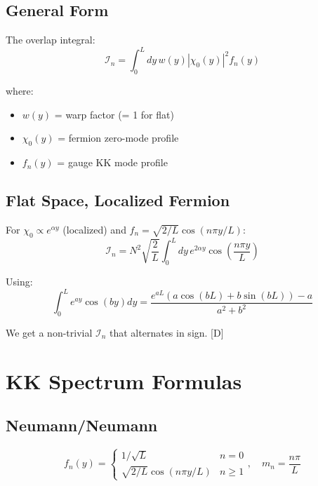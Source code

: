 \documentclass[11pt,a4paper]{article}
\newcommand{\tagD}{\textcolor{blue!70!black}{[D]}}
\begin{document}
\subsection{General Form}

The overlap integral:
\begin{equation}
\label{eq:app-overlap}
\mathcal{I}_n = \int_0^L dy\, w(y) |\chi_0(y)|^2 f_n(y)
\end{equation}

where:
\begin{itemize}
    \item $w(y)$ = warp factor (= 1 for flat)
    \item $\chi_0(y)$ = fermion zero-mode profile
    \item $f_n(y)$ = gauge KK mode profile
\end{itemize}

\subsection{Flat Space, Localized Fermion}

For $\chi_0 \propto e^{\alpha y}$ (localized) and $f_n = \sqrt{2/L}\cos(n\pi y/L)$:
\begin{equation}
\label{eq:app-overlap-loc}
\mathcal{I}_n = N^2 \sqrt{\frac{2}{L}} \int_0^L dy\, e^{2\alpha y} \cos\left(\frac{n\pi y}{L}\right)
\end{equation}

Using:
\begin{equation}
\label{eq:app-integral}
\int_0^L e^{ay} \cos(by) dy = \frac{e^{aL}(a\cos(bL) + b\sin(bL)) - a}{a^2 + b^2}
\end{equation}

We get a non-trivial $\mathcal{I}_n$ that alternates in sign. \tagD

\section{KK Spectrum Formulas}
\label{app:kk}

\subsection{Neumann/Neumann}

\begin{equation}
\label{eq:app-NN}
f_n(y) = \begin{cases}
1/\sqrt{L} & n = 0 \\
\sqrt{2/L}\cos(n\pi y/L) & n \geq 1
\end{cases}, \quad m_n = \frac{n\pi}{L}
\end{equation}
\end{document}
